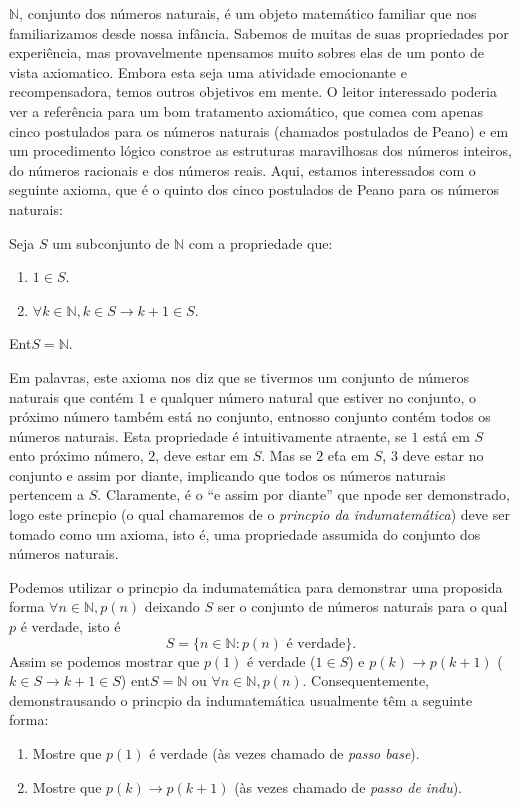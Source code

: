 $\mathbb{N}$, conjunto dos n\'umeros naturais, \'e um objeto matem\'atico familiar que nos familiarizamos desde nossa inf\^ancia. Sabemos de muitas de suas propriedades por experi\^encia, mas provavelmente n\ao pensamos muito sobres elas de um ponto de vista axiomatico. Embora esta seja uma atividade emocionante e recompensadora, temos outros objetivos em mente. O leitor interessado poderia ver a refer\^encia \cite{landau:1966} para um bom tratamento axiom\'atico, que come\cc a com apenas cinco postulados para os n\'umeros naturais (chamados postulados de Peano) e em um procedimento l\'ogico constroe as estruturas maravilhosas dos n\'umeros inteiros, do n\'umeros racionais e dos n\'umeros reais. Aqui, estamos interessados com o seguinte axioma, que \'e o quinto dos cinco postulados de Peano para os n\'umeros naturais:
\begin{axiob}
 Seja $S$ um subconjunto de $\mathbb{N}$ com a propriedade que:
\begin{enumerate}[{\bf a)}]
\item $1\in S$.
\item $\forall k\in \mathbb{N}, k\in S \rightarrow k+1\in S$. 
\end{enumerate}
Ent\ao $S=\mathbb{N}$. 
\end{axiob}

Em palavras, este axioma nos diz que se tivermos um conjunto de n\'umeros naturais que cont\'em $1$ e qualquer n\'umero natural que estiver no conjunto, o pr\'oximo n\'umero tamb\'em est\'a no conjunto, ent\ao nosso conjunto cont\'em todos os n\'umeros naturais. Esta propriedade \'e intuitivamente atraente, se $1$ est\'a em $S$ ent\ao o pr\'oximo n\'umero, $2$, deve estar em $S$. Mas se $2$ e\'ta em $S$, $3$ deve estar no conjunto e assim por diante, implicando que todos os n\'umeros naturais pertencem a $S$. Claramente, \'e o ``e assim por diante'' que n\ao pode ser demonstrado, logo este princ\ih pio (o qual chamaremos de o {\it princ\ih pio da indu\cao matem\'atica}) deve ser tomado como um axioma, isto \'e, uma propriedade assumida do conjunto dos n\'umeros naturais.

Podemos utilizar o princ\ih pio da indu\cao matem\'atica para demonstrar uma proposi\cao da forma $\forall n\in\mathbb{N}, p(n)$ deixando $S$ ser o conjunto de n\'umeros naturais para o qual $p$ \'e verdade, isto \'e
\[
S=\{n\in\mathbb{N}: p(n) \textrm{ \'e verdade}\}.
\]
Assim se podemos mostrar que $p(1)$ \'e verdade ($1\in S$) e $p(k)\rightarrow p(k+1)$ ($k\in S \rightarrow k+1\in S$) ent\ao $S=\mathbb{N}$ ou $\forall n\in \mathbb{N}, p(n)$. Consequentemente, demonstra\coes usando o princ\ih pio da indu\cao matem\'atica usualmente t\^em a seguinte forma:
\begin{enumerate}[{\bf a)}]
\item Mostre que $p(1)$ \'e verdade (\`as vezes chamado de {\it passo base}). 
\item Mostre que $p(k)\to p(k+1)$ (\`as vezes chamado de {\it passo de indu\caoi}).   
\end{enumerate}

